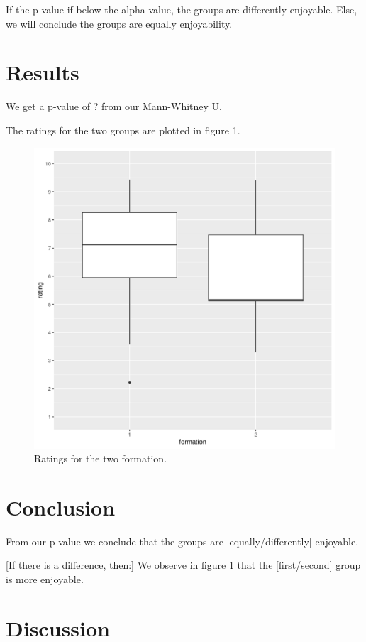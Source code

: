 \documentclass{article}
\begin{document}
If the p value if below the alpha value,
the groups are differently enjoyable.
Else, we will conclude the groups 
are equally enjoyability.

\section{Results}

We get a p-value of ? from our
Mann-Whitney U. 

The ratings for the two groups are plotted in
figure 1. 

\begin{figure}[!htbp]
  \includegraphics[width=\textwidth]{figure_1.png}
  \caption{
    Ratings for the two formation. 
  }
  \label{fig:1}
\end{figure}

\section{Conclusion}

From our p-value we conclude that
the groups are [equally/differently] enjoyable.

[If there is a difference, then:]
We observe in figure 1 that the [first/second]
group is more enjoyable.

\section{Discussion}
\end{document}

